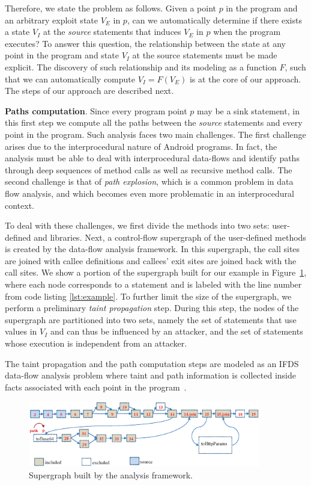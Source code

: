  Therefore, we state the problem as follows. Given a point $p$ in the program and an arbitrary exploit state $V_E$ in $p$, can we automatically determine if there exists a state $V_I$ at the \textit{source} statements that induces $V_E$ in $p$ when the program executes?  To answer this question, the relationship between the state at any point in the program and state $V_I$ at the source statements must be made explicit. The discovery of such relationship and its modeling as a function $F$, such that we can automatically compute $V_I = F(V_E)$ is at the core of our approach. The steps of our approach are described next. 

\textbf{Paths computation}. Since every program point $p$ may be a sink statement, in this first step we compute all the paths between the \textit{source} statements and every point in the program. Such analysis faces two main challenges. The first challenge arises due to the interprocedural nature of Android programs. In fact, the analysis must be able to deal with interprocedural data-flows and identify paths through deep sequences of method calls as well as recursive method calls. The second challenge is that of \textit{path explosion}, which is a common problem in data flow analysis, and which becomes even more problematic in an interprocedural context. 

To deal with these challenges, we first divide the methods into two sets: user-defined and libraries. Next, a control-flow supergraph of the user-defined methods is created by the data-flow analysis framework. In this supergraph, the call sites are joined with callee definitions and callees' exit sites are joined back with the call sites. We show a portion of the supergraph built for our example in Figure~\ref{fig:supergraph}, where each node corresponds to a statement and is labeled with the line number from code listing \ref{lst:example}. To further limit the size of the supergraph, we perform a preliminary \textit{taint propagation} step. During this step, the nodes of the supergraph are partitioned into two sets, namely the set of statements that use values in $V_I$ and can thus be influenced by an attacker, and the set of statements whose execution is independent from an attacker. 

The taint propagation and the path computation steps are modeled as an IFDS data-flow analysis problem where taint and path information is collected inside facts associated with each point in the program~\cite{heros,Bodden:2012:IDA:2259051.2259052}. 
\setlength{\belowcaptionskip}{-10pt}
\begin{figure}[t]
  \centering
    \includegraphics[width=4in]{./images/supergraph.eps}
  \caption{Supergraph built by the analysis framework. \label{fig:supergraph}}
 \end{figure}

